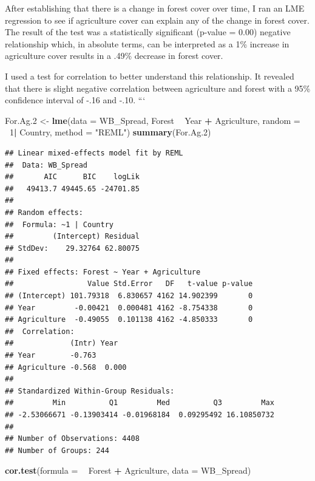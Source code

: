 \documentclass[12pt,]{article}
\newenvironment{Shaded}{\begin{snugshade}}{\end{snugshade}}
\newcommand{\KeywordTok}[1]{\textcolor[rgb]{0.13,0.29,0.53}{\textbf{#1}}}
\newcommand{\DataTypeTok}[1]{\textcolor[rgb]{0.13,0.29,0.53}{#1}}
\newcommand{\DecValTok}[1]{\textcolor[rgb]{0.00,0.00,0.81}{#1}}
\newcommand{\StringTok}[1]{\textcolor[rgb]{0.31,0.60,0.02}{#1}}
\newcommand{\OperatorTok}[1]{\textcolor[rgb]{0.81,0.36,0.00}{\textbf{#1}}}
\newcommand{\NormalTok}[1]{#1}
\begin{document}
After establishing that there is a change in forest cover over time, I
ran an LME regression to see if agriculture cover can explain any of the
change in forest cover. The result of the test was a statistically
significant (p-value = 0.00) negative relationship which, in absolute
terms, can be interpreted as a 1\% increase in agriculture cover results
in a .49\% decrease in forest cover.

I used a test for correlation to better understand this relationship. It
revealed that there is slight negative correlation between agriculture
and forest with a 95\% confidence interval of -.16 and -.10. ```

\begin{Shaded}
\begin{Highlighting}[]
\NormalTok{For.Ag.}\DecValTok{2}\NormalTok{ <-}\StringTok{  }\KeywordTok{lme}\NormalTok{(}\DataTypeTok{data =}\NormalTok{ WB_Spread,}
\NormalTok{              Forest }\OperatorTok{~}\StringTok{ }\NormalTok{Year }\OperatorTok{+}\StringTok{ }\NormalTok{Agriculture,}
              \DataTypeTok{random =} \OperatorTok{~}\DecValTok{1}\OperatorTok{|}\StringTok{ }\NormalTok{Country,}
              \DataTypeTok{method =} \StringTok{"REML"}\NormalTok{)}
\KeywordTok{summary}\NormalTok{(For.Ag.}\DecValTok{2}\NormalTok{)}
\end{Highlighting}
\end{Shaded}

\begin{verbatim}
## Linear mixed-effects model fit by REML
##  Data: WB_Spread 
##       AIC      BIC    logLik
##   49413.7 49445.65 -24701.85
## 
## Random effects:
##  Formula: ~1 | Country
##         (Intercept) Residual
## StdDev:    29.32764 62.80075
## 
## Fixed effects: Forest ~ Year + Agriculture 
##                 Value Std.Error   DF   t-value p-value
## (Intercept) 101.79318  6.830657 4162 14.902399       0
## Year         -0.00421  0.000481 4162 -8.754338       0
## Agriculture  -0.49055  0.101138 4162 -4.850333       0
##  Correlation: 
##             (Intr) Year  
## Year        -0.763       
## Agriculture -0.568  0.000
## 
## Standardized Within-Group Residuals:
##         Min          Q1         Med          Q3         Max 
## -2.53066671 -0.13903414 -0.01968184  0.09295492 16.10850732 
## 
## Number of Observations: 4408
## Number of Groups: 244
\end{verbatim}

\begin{Shaded}
\begin{Highlighting}[]
\KeywordTok{cor.test}\NormalTok{(}\DataTypeTok{formula =} \OperatorTok{~}\StringTok{ }\NormalTok{Forest }\OperatorTok{+}\StringTok{ }\NormalTok{Agriculture,}
         \DataTypeTok{data =}\NormalTok{ WB_Spread)}
\end{Highlighting}
\end{Shaded}
\end{document}
